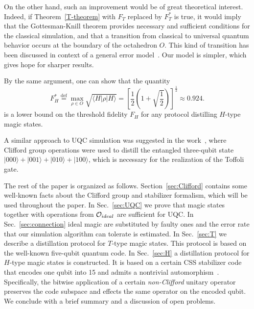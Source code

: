 \documentclass[pra,twocolumn,showpacs]{revtex4}
\newcommand{\calO}{{\cal O }}
\newcommand{\la}{\langle}
\newcommand{\ra}{\rangle}
\newcommand{\bydef}{\stackrel{\mathrm{def}}{=}}
\newcommand{\Tt}{$T$}
\newcommand{\Hh}{$H$}
\begin{document}
On the other hand, such an improvement would be of great theoretical
interest. Indeed, if Theorem~\ref{T-theorem} with $F_T$ replaced by $F_T^*$ is
true, it would imply that the Gottesman-Knill theorem provides necessary and
sufficient conditions for the classical simulation, and that a transition from
classical to universal quantum behavior occurs at the boundary of the
octahedron $O$.  This kind of transition has been discussed in context of a
general error model~\cite{Aharonov99}. Our model is simpler, which gives hope
for sharper results.

By the same argument, one can show that the quantity
\[
F_H^* \bydef \max_{\rho \in O} \sqrt{\la H|\rho |H\ra} =
\left[\frac12\left( 1+\sqrt{\frac12}\right)\right]^\frac12
\approx 0.924.
\]
is a lower bound on the threshold fidelity $F_H$ for any protocol
distilling \Hh-type magic states.

A similar approach to UQC simulation was suggested in the
work~\cite{Dennis01}, where Clifford group operations were used to distill the
entangled three-qubit state $|000\ra + |001\ra + |010\ra + |100\ra$, which is
necessary for the realization of the Toffoli gate.

The rest of the paper is organized as follows.  Section~\ref{sec:Clifford}
contains some well-known facts about the Clifford group and stabilizer
formalism, which will be used throughout the paper.  In Sec.~\ref{sec:UQC}
we prove that magic states together with operations from $\calO_{ideal}$ are
sufficient for UQC. In Sec.~\ref{sec:connection} ideal magic are substituted by
faulty ones and the error rate that our simulation 
algorithm can tolerate is estimated.
In Sec.~\ref{sec:T} we describe a distillation
protocol for \Tt-type magic states. This protocol is based on the well-known
five-qubit quantum code. In Sec.~\ref{sec:H} a distillation protocol for
\Hh-type magic states is constructed. It is based on a certain CSS stabilizer
code that encodes one qubit into 15 and admits a nontrivial
automorphism~\cite{KLZ96}. Specifically, the bitwise application of a certain
{\it non-Clifford} unitary operator preserves the code subspace and effects
the same operator on the encoded qubit. We conclude with a brief summary and a
discussion of open problems.



\end{document}

